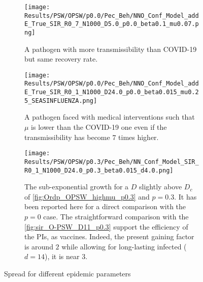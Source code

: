 \documentclass[a4paper,10pt,twoside]{book} %
\theoremstyle{definition}
\begin{document}
\begin{figure}[p]
	\centering
	\begin{subfigure}{\linewidth}
		\centering
		\texttt{[image: Results/PSW/OPSW/p0.0/Pec\_Beh/NNO\_Conf\_Model\_addE\_True\_SIR\_R0\_7\_N1000\_D5.0\_p0.0\_beta0.1\_mu0.07.png]}
		\caption{A pathogen with more transmissibility than COVID-19 but same recovery rate.}
		\label{fig:sir_O-PSW_D5_d14_b0.1}
	\end{subfigure}
	\vfill
	\begin{subfigure}[t]{\linewidth}
		\centering
		\texttt{[image: Results/PSW/OPSW/p0.0/Pec\_Beh/NNO\_Conf\_Model\_addE\_True\_SIR\_R0\_1\_N1000\_D24.0\_p0.0\_beta0.015\_mu0.25\_SEASINFLUENZA.png]}
		\caption{A pathogen faced with medical interventions such that $\mu$ is lower than the COVID-19 one even if the transmissibility has become $ 7$ times higher.}
		\label{fig:sir_O-PSW_D23_d4_p0.3}
	\end{subfigure}
	\vfill
	\begin{subfigure}{\linewidth}
		\centering
		\texttt{[image: Results/PSW/OPSW/p0.3/Pec\_Beh/NN\_Conf\_Model\_SIR\_R0\_1\_N1000\_D24.0\_p0.3\_beta0.015\_d4.0.png]}
		\caption{The sub-exponential growth for a $D$ slightly above $D_c$ of \autoref{fig:Ordp_OPSW_highmu_p0.3} and $p = 0.3.$ It has been reported here for a direct comparison with the $p = 0$ case. The straightforward comparison with the \autoref{fig:sir_O-PSW_D11_p0.3} support the efficiency of the PIs, as vaccines. Indeed, the present gaining factor is around $2$ while allowing for long-lasting infected ($d = 14$), it is near $3$.}
		\label{fig:sir_O-PSW_D24_d4}
	\end{subfigure}
	\caption{Spread for different epidemic parameters}
	\label{fig:OPSW_COVID_p0.3}
\end{figure}

\clearpage
\end{document}

